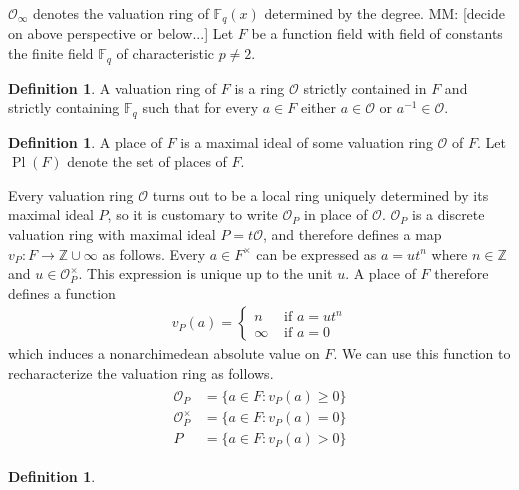 \documentclass{dcthesis}
\newcommand{\ZZ}{\mathbb Z}
\newcommand{\defi}[1]{\textsf{#1}}
\newcommand{\mm}[1]{{\color{blue} \sf MM: [#1]}}
\newcommand{\FF}{\mathbb{F}}
\DeclareMathOperator{\Pl}{Pl}
\numberwithin{equation}{section}
\theoremstyle{definition}
\newtheorem{definition}[equation]{Definition}
\theoremstyle{remark}
\begin{document}
{{{    $\mathcal{O}_\infty$ denotes the valuation
    ring of $\FF_q(x)$ determined by the
    degree.
    \mm{decide on above perspective or below...}
    Let $F$ be a function field
    with field of constants the
    finite field $\FF_q$
    of characteristic $p\neq 2$.
    \begin{definition}
      \label{def:valuationring}
      A \defi{valuation ring} of $F$
      is a ring $\mathcal{O}$
      strictly contained in $F$
      and strictly containing $\FF_q$
      such that for every $a\in F$
      either $a\in\mathcal{O}$
      or $a^{-1}\in\mathcal{O}$.
    \end{definition}
    \begin{definition}
      \label{def:places}
      A \defi{place} of $F$ is a maximal ideal of
      some valuation ring $\mathcal{O}$ of $F$.
      Let $\Pl(F)$ denote the set of places of $F$.
    \end{definition}
    Every valuation ring $\mathcal{O}$
    turns out to be a local ring uniquely
    determined by its maximal ideal $P$,
    so it is customary to write
    $\mathcal{O}_P$ in place of $\mathcal{O}$.
    $\mathcal{O}_P$ is a
    discrete valuation ring with
    maximal ideal $P=t\mathcal{O}$,
    and therefore
    defines a map $v_P\colon F\to\ZZ\cup\infty$
    as follows.
    Every $a\in F^\times$
    can be expressed as $a=ut^n$
    where $n\in\ZZ$ and $u\in\mathcal{O}_P^\times$.
    This expression is unique up to the unit $u$.
    A place of $F$ therefore defines a function
    \begin{align}
      \label{eqn:vP}
      v_P(a) =
      \begin{cases}
        n&\text{ if }a=ut^n\\
        \infty&\text{ if }a=0
      \end{cases}
    \end{align}
    which induces a nonarchimedean absolute value
    on $F$.
    We can use this function to recharacterize
    the valuation ring as follows.
    \begin{align}
      \label{eqn:valuationringfromabs}
      \begin{split}
        \mathcal{O}_P
        &= \{a\in F : v_P(a)\geq 0\}\\
        \mathcal{O}_P^\times
        &= \{a\in F : v_P(a)=0\}\\
        P
        &=\{a\in F : v_P(a)>0\}
      \end{split}
    \end{align}
    \begin{definition}

\end{definition}}}}
\end{document}
